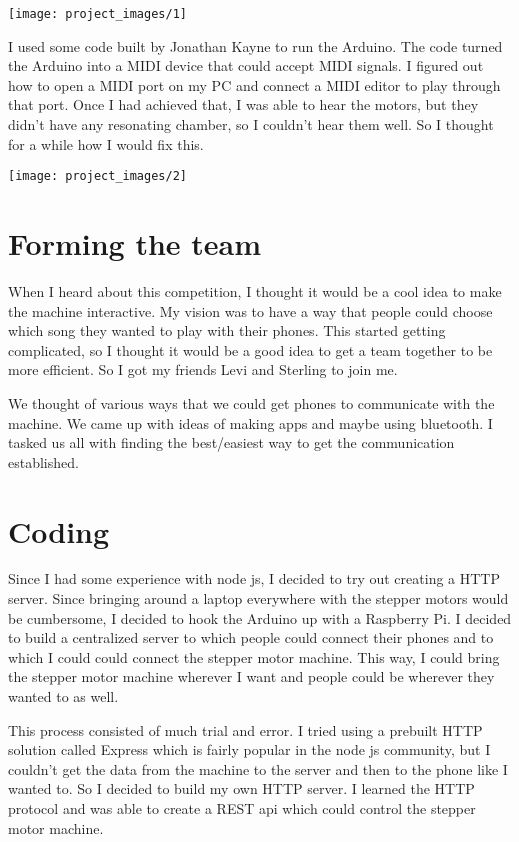 \documentclass[12pt,letterpaper]{article}
\begin{document}
	\begin{center}
		\texttt{[image: project\_images/1]}
	\end{center}

	I used some code built by Jonathan Kayne to run the Arduino. The code turned the Arduino into a MIDI device that could accept MIDI signals. I figured out how to open a MIDI port on my PC and connect a MIDI editor to play through that port. Once I had achieved that, I was able to hear the motors, but they didn't have any resonating chamber, so I couldn't hear them well. So I thought for a while how I would fix this. 
	
	\begin{center}
		\texttt{[image: project\_images/2]}
	\end{center} 
	
	\section{Forming the team}
	
	When I heard about this competition, I thought it would be a cool idea to make the machine interactive. My vision was to have a way that people could choose which song they wanted to play with their phones. This started getting complicated, so I thought it would be a good idea to get a team together to be more efficient. So I got my friends Levi and Sterling to join me. 
	
	We thought of various ways that we could get phones to communicate with the machine. We came up with ideas of making apps and maybe using bluetooth. I tasked us all with finding the best/easiest way to get the communication established. 
	
	\section{Coding}
	
	Since I had some experience with node js, I decided to try out creating a HTTP server. Since bringing around a laptop everywhere with the stepper motors would be cumbersome, I decided to hook the Arduino up with a Raspberry Pi. I decided to build a centralized server to which people could connect their phones and to which I could could connect the stepper motor machine. This way, I could bring the stepper motor machine wherever I want and people could be wherever they wanted to as well. 
	
	This process consisted of much trial and error. I tried using a prebuilt HTTP solution called Express which is fairly popular in the node js community, but I couldn't get the data from the machine to the server and then to the phone like I wanted to. So I decided to build my own HTTP server. I learned the HTTP protocol and was able to create a REST api which could control the stepper motor machine. 
	
\end{document}
